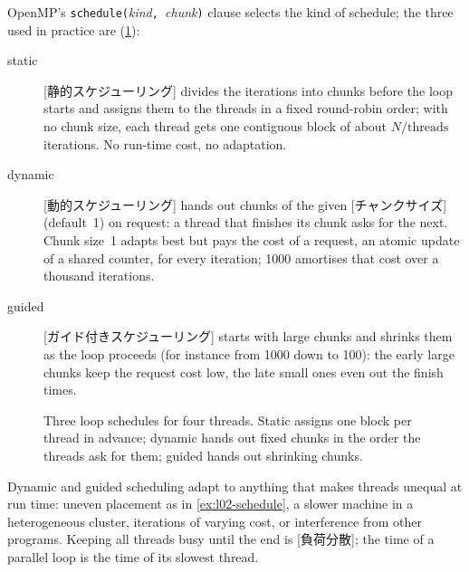 \documentclass[../main.tex]{subfiles}
\begin{document}
OpenMP's \texttt{schedule(}\textit{kind}\texttt{, }\textit{chunk}\texttt{)}
clause selects the kind of schedule; the three used in practice are
(\cref{fig:l02-schedule}):
\begin{description}
  \item[static]  [静的スケジューリング] divides the
    iterations into chunks before the loop starts and assigns them to the
    threads in a fixed round-robin order; with no chunk size, each thread
    gets one contiguous block of about $N/\text{threads}$ iterations.  No
    run-time cost, no adaptation.
  \item[dynamic]  [動的スケジューリング] hands out
    chunks of the given [チャンクサイズ] (default~1) on
    request: a thread that finishes its chunk asks for the next.  Chunk
    size~1 adapts best but pays the cost of a request, an atomic update
    of a shared counter, for every iteration; \num{1000} amortises that
    cost over a thousand iterations.
  \item[guided]  [ガイド付きスケジューリング]
    starts with large chunks and shrinks them as the loop proceeds (for
    instance from \num{1000} down to \num{100}): the early large chunks
    keep the request cost low, the late small ones even out the finish
    times.
\end{description}

\begin{figure}[tb]
  \centering
  
  \caption{Three loop schedules for four threads.  Static assigns one
    block per thread in advance; dynamic hands out fixed chunks in the
    order the threads ask for them; guided hands out shrinking chunks.}
  \label{fig:l02-schedule}
\end{figure}

Dynamic and guided scheduling adapt to anything that makes threads
unequal at run time: uneven placement as in \cref{ex:l02-schedule}, a
slower machine in a heterogeneous cluster, iterations of varying cost, or
interference from other programs.  Keeping all threads busy until the end
is [負荷分散]; the time of a parallel loop is the
time of its slowest thread.
\end{document}
